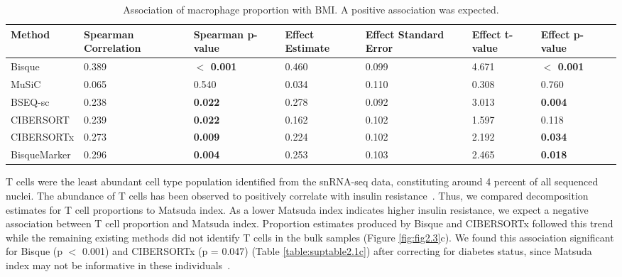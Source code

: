 \begin{table}
    \scriptsize
    \centering
    \begin{tabularx}{\textwidth}{|L|L|L|L|L|L|L|L|}
    \hline
    \textbf{Method} & \textbf{Spearman Correlation} & \textbf{Spearman p-value} & \textbf{Effect Estimate} & \textbf{Effect Standard Error} & \textbf{Effect t-value} & \textbf{Effect p-value}   \\ \hline
    Bisque & 0.389 & \textbf{$\mathbf{<}$ 0.001} & 0.460 & 0.099 & 4.671 & \textbf{$\mathbf{<}$ 0.001}  \\ \hline
    MuSiC & 0.065 & 0.540 & 0.034 & 0.110 & 0.308 & 0.760  \\ \hline
    BSEQ-sc & 0.238 & \textbf{0.022} & 0.278 & 0.092 & 3.013 & \textbf{0.004}  \\ \hline
    CIBERSORT & 0.239 & \textbf{0.022} & 0.162 & 0.102 & 1.597 & 0.118 \\ \hline
    CIBERSORTx & 0.273 & \textbf{0.009} & 0.224 & 0.102 & 2.192 & \textbf{0.034} \\ \hline
    BisqueMarker & 0.296 & \textbf{0.004} & 0.253 & 0.103 & 2.465 & \textbf{0.018}  \\ \hline    
    \end{tabularx}
    \caption{Association of macrophage proportion with BMI. A positive association was expected.}
    \label{table:suptable2.1b}
\end{table}

T cells were the least abundant cell type population identified from the snRNA-seq data, constituting around 4 percent of all sequenced nuclei. The abundance of T cells has been observed to positively correlate with insulin resistance~\cite{McLaughlin2014-gn}. Thus, we compared decomposition estimates for T cell proportions to Matsuda index. As a lower Matsuda index indicates higher insulin resistance, we expect a negative association between T cell proportion and Matsuda index. Proportion estimates produced by Bisque and CIBERSORTx followed this trend while the remaining existing methods did not identify T cells in the bulk samples (Figure \ref{fig:fig2.3}c). We found this association significant for Bisque (p $<$ 0.001) and CIBERSORTx (p = 0.047) (Table \ref{table:suptable2.1c}) after correcting for diabetes status, since Matsuda index may not be informative in these individuals~\cite{Gutch2015-db}. 

